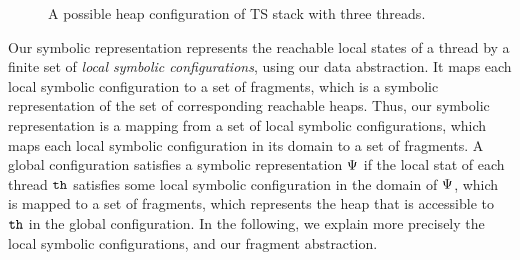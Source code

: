\begin{figure}
	
\caption{A possible heap configuration of TS stack with three threads.}
\label{fig:tsshape}
\end{figure} 
%	


Our symbolic representation represents the reachable local states of a thread by
a finite set of {\em local symbolic configurations}, using our
data abstraction.
It maps each local symbolic configuration to a set of fragments, which
is a symbolic representation of the set of corresponding reachable heaps.
Thus, our symbolic representation is a mapping from a set of local symbolic
configurations, which maps each local symbolic configuration in its domain
to a set of fragments.
A global configuration satisfies a symbolic representation $\Psi$
if the local stat of each thread ${\tt th}$ satisfies some local symbolic
configuration in the domain of $\Psi$, which is mapped to a set
of fragments, which represents the heap that is accessible to ${\tt th}$ in
the global configuration. In the following, we explain more precisely the
local symbolic configurations, and our fragment abstraction.

